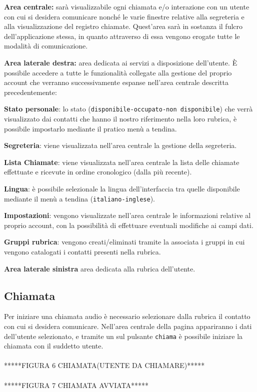 \begin{description}
\item \textbf{Area centrale:} sarà visualizzabile ogni chiamata e/o interazione con un utente con cui si desidera comunicare nonché le varie finestre relative alla segreteria e alla visualizzazione del registro chiamate. Quest'area sarà in sostanza il fulcro dell'applicazione stessa, in quanto attraverso di essa vengono erogate tutte le modalità di comunicazione.

\item \textbf{Area laterale destra:} area dedicata ai servizi a disposizione dell'utente. È possibile accedere a tutte le funzionalità collegate alla gestione del proprio account che verranno successivamente espanse nell'area centrale descritta precedentemente:
\begin{description}
\item \textbf{Stato personale}: lo stato (\texttt{disponibile-occupato-non disponibile}) che verrà visualizzato dai contatti che hanno il nostro riferimento nella loro rubrica, è possibile impostarlo mediante il pratico menù a tendina.
\item \textbf{Segreteria}: viene visualizzata nell'area centrale la gestione della segreteria.
\item \textbf{Lista Chiamate}: viene visualizzata nell'area centrale la lista delle chiamate effettuate e ricevute in ordine cronologico (dalla più recente).
\item \textbf{Lingua}: è possibile selezionale la lingua dell'interfaccia tra quelle disponibile mediante il menù a tendina (\texttt{italiano-inglese}).
\item \textbf{Impostazioni}: vengono visualizzate nell'area centrale le informazioni relative al proprio account, con la possibilità di effettuare eventuali modifiche ai campi dati.
\item \textbf{Gruppi rubrica}: vengono creati/eliminati tramite la  associata i gruppi in cui vengono catalogati i contatti presenti nella rubrica.
\end{description}
\item \textbf{Area laterale sinistra} area dedicata alla rubrica dell'utente.  
\end{description}

\subsection{Chiamata}
Per iniziare una chiamata audio è necessario selezionare dalla rubrica il contatto con cui si desidera comunicare. Nell'area centrale della pagina appariranno i dati dell'utente selezionato, e tramite un  sul pulsante \texttt{chiama} è possibile iniziare la chiamata con il suddetto utente.
\\\\*****FIGURA 6 CHIAMATA(UTENTE DA CHIAMARE)*****
\\\\*****FIGURA 7 CHIAMATA AVVIATA*****
